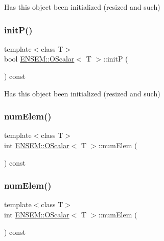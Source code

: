 Has this object been initialized (resized and such) 

\mbox{\label{classENSEM_1_1OScalar_a2de94d9cb377fa4ca961d0a8906a76b6}} 
\subsubsection{\texorpdfstring{initP()}{initP()}\hspace{0.1cm}{\footnotesize\ttfamily [3/3]}}
{\footnotesize\ttfamily template$<$class T$>$ \\
bool \mbox{\hyperlink{classENSEM_1_1OScalar}{E\+N\+S\+E\+M\+::\+O\+Scalar}}$<$ T $>$\+::initP (\begin{DoxyParamCaption}{ }\end{DoxyParamCaption}) const\hspace{0.3cm}{\ttfamily [inline]}}



Has this object been initialized (resized and such) 

\mbox{\label{classENSEM_1_1OScalar_aa9a7a2cddc34ba1add28369a764ced80}} 
\subsubsection{\texorpdfstring{numElem()}{numElem()}\hspace{0.1cm}{\footnotesize\ttfamily [1/3]}}
{\footnotesize\ttfamily template$<$class T$>$ \\
int \mbox{\hyperlink{classENSEM_1_1OScalar}{E\+N\+S\+E\+M\+::\+O\+Scalar}}$<$ T $>$\+::num\+Elem (\begin{DoxyParamCaption}{ }\end{DoxyParamCaption}) const\hspace{0.3cm}{\ttfamily [inline]}}

\mbox{\label{classENSEM_1_1OScalar_aa9a7a2cddc34ba1add28369a764ced80}} 
\subsubsection{\texorpdfstring{numElem()}{numElem()}\hspace{0.1cm}{\footnotesize\ttfamily [2/3]}}
{\footnotesize\ttfamily template$<$class T$>$ \\
int \mbox{\hyperlink{classENSEM_1_1OScalar}{E\+N\+S\+E\+M\+::\+O\+Scalar}}$<$ T $>$\+::num\+Elem (\begin{DoxyParamCaption}{ }\end{DoxyParamCaption}) const\hspace{0.3cm}{\ttfamily [inline]}}

